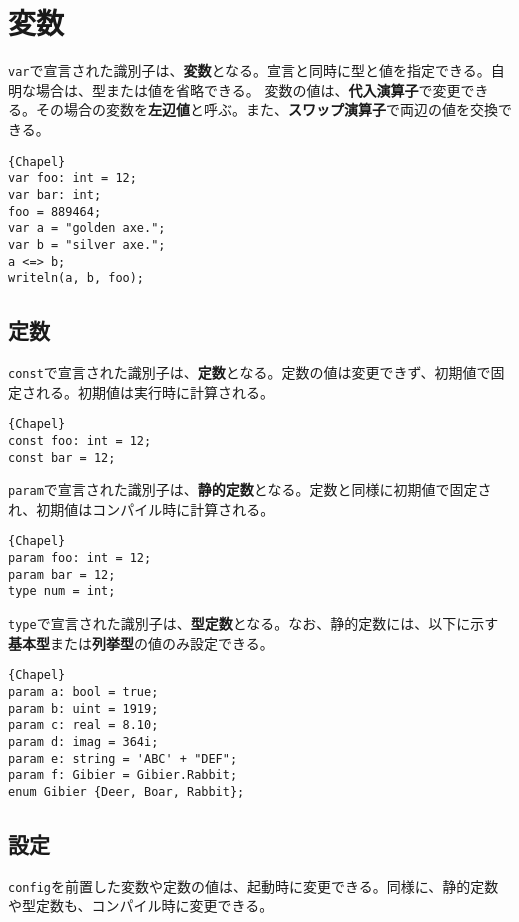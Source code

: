 \documentclass[10pt,a4paper]{book}
\begin{document}
\chapter{変数}

\texttt{var}で宣言された識別子は、\textbf{変数}となる。宣言と同時に型と値を指定できる。自明な場合は、型または値を省略できる。
変数の値は、\textbf{代入演算子}で変更できる。その場合の変数を\textbf{左辺値}と呼ぶ。また、\textbf{スワップ演算子}で両辺の値を交換できる。

\begin{Verbatim}{Chapel}
var foo: int = 12;
var bar: int;
foo = 889464;
var a = "golden axe.";
var b = "silver axe.";
a <=> b;
writeln(a, b, foo);
\end{Verbatim}

\section{定数}

\texttt{const}で宣言された識別子は、\textbf{定数}となる。定数の値は変更できず、初期値で固定される。初期値は実行時に計算される。

\begin{Verbatim}{Chapel}
const foo: int = 12;
const bar = 12;
\end{Verbatim}

\texttt{param}で宣言された識別子は、\textbf{静的定数}となる。定数と同様に初期値で固定され、初期値はコンパイル時に計算される。

\begin{Verbatim}{Chapel}
param foo: int = 12;
param bar = 12;
type num = int;
\end{Verbatim}

\texttt{type}で宣言された識別子は、\textbf{型定数}となる。なお、静的定数には、以下に示す\textbf{基本型}または\textbf{列挙型}の値のみ設定できる。

\begin{Verbatim}{Chapel}
param a: bool = true;
param b: uint = 1919;
param c: real = 8.10;
param d: imag = 364i;
param e: string = 'ABC' + "DEF";
param f: Gibier = Gibier.Rabbit;
enum Gibier {Deer, Boar, Rabbit};
\end{Verbatim}

\section{設定}

\texttt{config}を前置した変数や定数の値は、起動時に変更できる。同様に、静的定数や型定数も、コンパイル時に変更できる。
\end{document}
